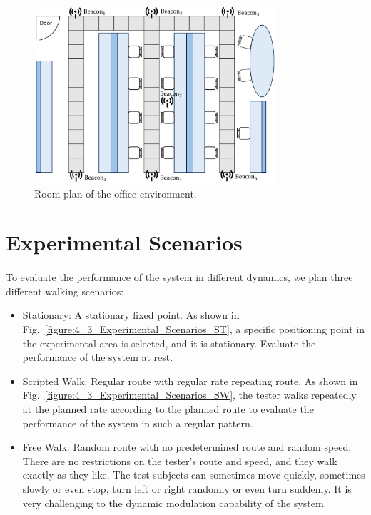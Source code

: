 \documentclass[a4paper,12pt]{report}
\begin{document}
\begin{figure}[tbph]
    \begin{center}
    \includegraphics[width=0.8\textwidth]{images/4_2_Experimental_Environment_plan.png}
    \caption{Room plan of the office environment.}
    \label{figure:4_2_Experimental_Environment_plan}
    \end{center}
\end{figure}

\section{Experimental Scenarios}

\paragraph{}
To evaluate the performance of the system in different dynamics, we plan three different walking scenarios:

\begin{itemize}
\item  Stationary: A stationary fixed point. As shown in Fig.~\ref{figure:4_3_Experimental_Scenarios_ST}, a specific positioning point in the experimental area is selected, and it is stationary. Evaluate the performance of the system at rest.
\item  Scripted Walk: Regular route with regular rate repeating route. As shown in Fig.~\ref{figure:4_3_Experimental_Scenarios_SW}, the tester walks repeatedly at the planned rate according to the planned route to evaluate the performance of the system in such a regular pattern.
\item  Free Walk: Random route with no predetermined route and random speed. There are no restrictions on the tester's route and speed, and they walk exactly as they like. The test subjects can sometimes move quickly, sometimes slowly or even stop, turn left or right randomly or even turn suddenly. It is very challenging to the dynamic modulation capability of the system.
\end{itemize}
%
\end{document}
